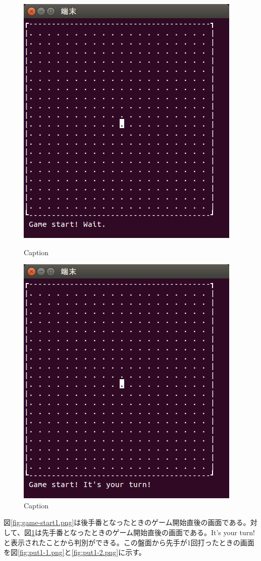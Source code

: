 \documentclass[a4j, titlepage, 10pt]{jsarticle}
\begin{document}
\begin{figure}[H]
  \begin{minipage}{0.5\hsize}
    \centering
    \includegraphics[scale=0.5]{img/game-start1.png}
    \caption{Caption}
    \label{fig:game-start1.png}
  \end{minipage}
  \begin{minipage}{0.5\hsize}
    \includegraphics[scale=0.5]{img/game-start2.png}
    \caption{Caption}
    \label{fig:game-start2.png}
  \end{minipage}
\end{figure}
図\ref{fig:game-start1.png}は後手番となったときのゲーム開始直後の画面である。対して、図\ref{fig:game-start2.png}は先手番となったときのゲーム開始直後の画面である。{\ttfamily It's your turn!}と表示されたことから判別ができる。この盤面から先手が1回打ったときの画面を図\ref{fig:put1-1.png}と\ref{fig:put1-2.png}に示す。
\end{document}
